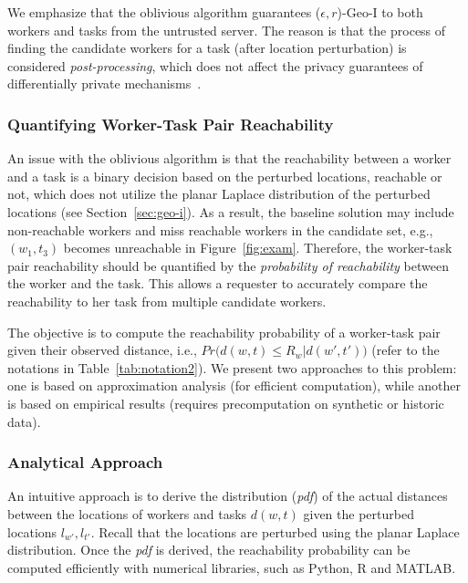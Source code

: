 \documentclass{USC-Thesis}
\numberwithin{equation}{chapter}
\begin{document}
We emphasize that the oblivious algorithm guarantees ($\epsilon,r$)-Geo-I to both workers and tasks from the untrusted server. The reason is that the process of finding the candidate workers for a task (after location perturbation) is considered \emph{post-processing}, which does not affect the privacy guarantees of differentially private mechanisms~\cite{mcsherry2009privacy}.

\subsubsection{Quantifying Worker-Task Pair Reachability}
\label{sec:reachability}

An issue with the oblivious algorithm is that the reachability between a worker and a task is a binary decision based on the perturbed locations, reachable or not, which does not utilize the planar Laplace distribution of the perturbed locations (see Section~\ref{sec:geo-i}). As a result, the baseline solution may include non-reachable workers and miss reachable workers in the candidate set, e.g., $(w_1,t_3)$ becomes unreachable in Figure~\ref{fig:exam}. Therefore, the worker-task pair reachability should be quantified by the \emph{probability of reachability} between the worker and the task. This allows a requester to accurately compare the reachability to her task from multiple candidate workers. 

The objective is to compute the reachability probability of a worker-task pair given their observed distance, i.e., $\mathit{Pr\big(d(w,t) \le R_w | d(w',t')\big)}$ (refer to the notations in Table~\ref{tab:notation2}). We present two approaches to this problem: one is based on approximation analysis (for efficient computation), while another is based on empirical results (requires precomputation on synthetic or historic data).

\subsubsection{Analytical Approach}
\label{sec:analytical}
An intuitive approach is to derive the distribution (\emph{pdf}) of the actual distances between the locations of workers and tasks $d(w,t)$ given the perturbed locations $l_{w'},l_{t'}$. Recall that the locations are perturbed using the planar Laplace distribution. Once the \emph{pdf} is derived, the reachability probability can be computed efficiently with numerical libraries, such as Python, R and MATLAB. 
\end{document}
